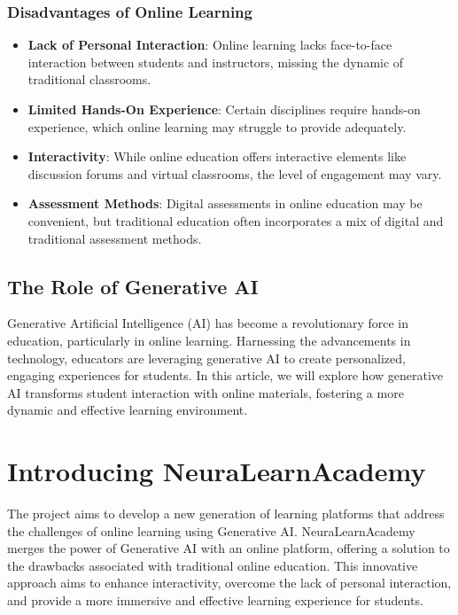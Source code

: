 \subsubsection*{Disadvantages of Online Learning}

\begin{itemize}[label=--]
	\item \textbf{Lack of Personal Interaction}: Online learning lacks face-to-face interaction between students and instructors, missing the dynamic of traditional classrooms.
	\item \textbf{Limited Hands-On Experience}: Certain disciplines require hands-on experience, which online learning may struggle to provide adequately.
	\item \textbf{Interactivity}: While online education offers interactive elements like discussion forums and virtual classrooms, the level of engagement may vary.
	\item \textbf{Assessment Methods}: Digital assessments in online education may be convenient, but traditional education often incorporates a mix of digital and traditional assessment methods.
\end{itemize}

\subsection{The Role of Generative AI}

Generative Artificial Intelligence (AI) has become a revolutionary force in education, particularly in online learning. Harnessing the advancements in technology, educators are leveraging generative AI to create personalized, engaging experiences for students. In this article, we will explore how generative AI transforms student interaction with online materials, fostering a more dynamic and effective learning environment.

\section{Introducing NeuraLearnAcademy}

The project aims to develop a new generation of learning platforms that address the challenges of online learning using Generative AI. NeuraLearnAcademy merges the power of Generative AI with an online platform, offering a solution to the drawbacks associated with traditional online education. This innovative approach aims to enhance interactivity, overcome the lack of personal interaction, and provide a more immersive and effective learning experience for students.

